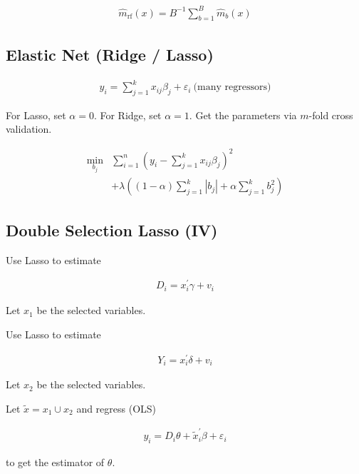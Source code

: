 \begin{align*}
    \widehat{m}_{\mathrm{rf}}(x)=B^{-1} \sum_{b=1}^B \widehat{m}_b(x)
\end{align*}


\subsection{Elastic Net (Ridge / Lasso)}

\begin{align*}
    y_i=\sum_{j=1}^k x_{i j} \beta_j+\varepsilon_i \: \text{(many regressors)}
\end{align*}

For Lasso, set $\alpha = 0$. For Ridge, set $\alpha = 1$. Get the parameters via $m$-fold cross validation.

\begin{align*}
    \min_{b_j} &\sum_{i=1}^n\left(y_i-\sum_{j=1}^k x_{i j} \beta_j\right)^2 \\
    &+\lambda\left((1-\alpha) \sum_{j=1}^k\left|b_j\right|+\alpha \sum_{j=1}^k b_j^2\right)
\end{align*}

\subsection{Double Selection Lasso (IV)}

Use Lasso to estimate

\begin{align*}
    D_i=x_i^{\prime} \gamma+v_i
\end{align*}

Let $x_1$ be the selected variables.

Use Lasso to estimate

\begin{align*}
    Y_i=x_i^{\prime} \delta+v_i
\end{align*}

Let $x_2$ be the selected variables.

Let $\widetilde{x}=x_1 \cup x_2$ and regress (OLS)

\begin{align*}
    y_i=D_i \theta+\widetilde{x}_i^{\prime} \beta+\varepsilon_i
\end{align*}

to get the estimator of $\theta$.